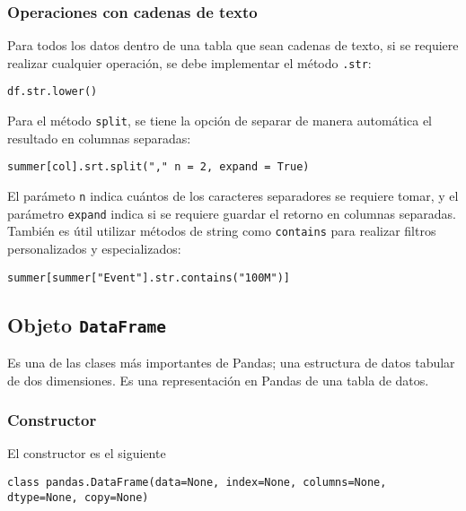 \subsubsection{Operaciones con cadenas de texto}
Para todos los datos dentro de una tabla que sean cadenas de texto, si se requiere realizar cualquier operación, se debe implementar el método \texttt{.str}:
\begin{verbatim}
df.str.lower()
\end{verbatim}
Para el método \texttt{split}, se tiene la opción de separar de manera automática el resultado en columnas separadas:
\begin{verbatim}
summer[col].srt.split("," n = 2, expand = True)
\end{verbatim}
El parámeto \texttt{n} indica cuántos de los caracteres separadores se requiere tomar, y el parámetro \texttt{expand} indica si se requiere guardar el retorno en columnas separadas. \\
También es útil utilizar métodos de string como \texttt{contains} para realizar filtros personalizados y especializados:
\begin{verbatim}
summer[summer["Event"].str.contains("100M")]
\end{verbatim}
\subsection{Objeto \texttt{DataFrame}}
Es una de las clases más importantes de Pandas; una estructura de datos tabular de dos dimensiones. Es una representación en Pandas de una tabla de datos.
\subsubsection{Constructor} El constructor es el siguiente
\begin{verbatim}
class pandas.DataFrame(data=None, index=None, columns=None, dtype=None, copy=None)
\end{verbatim}
